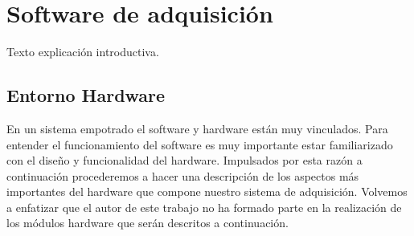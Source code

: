 \chapter{Software de adquisición}
\label{cap2}

Texto explicación introductiva.

\section{Entorno Hardware}
	En un sistema empotrado el software y hardware están muy vinculados. Para entender el funcionamiento del software es muy importante estar
	familiarizado con el diseño y funcionalidad del hardware. Impulsados por esta razón a continuación procederemos a hacer una descripción de
	los aspectos más importantes del hardware que compone nuestro sistema de adquisición. Volvemos a enfatizar que el autor de este trabajo no
	ha formado parte  en la realización de los módulos hardware que serán descritos a continuación.
